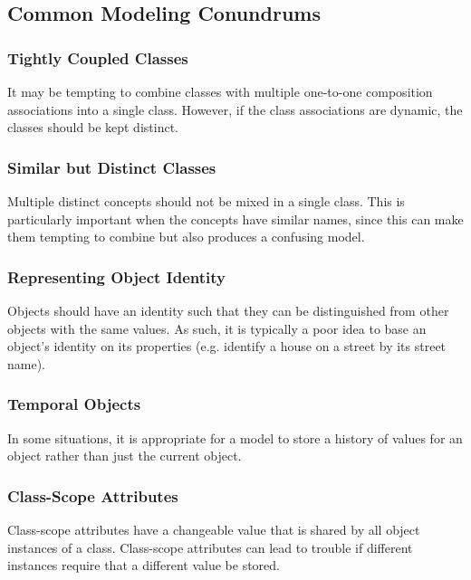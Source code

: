 \documentclass[12pt,titlepage]{article}
\begin{document}
    \subsection{Common Modeling Conundrums}

      \subsubsection{Tightly Coupled Classes}
        It may be tempting to combine classes with multiple one-to-one composition associations into a single class. However, if the class associations are dynamic, the classes should
        be kept distinct.

      \subsubsection{Similar but Distinct Classes}
        Multiple distinct concepts should not be mixed in a single class. This is particularly important when the concepts have similar names, since this can make them tempting to
        combine but also produces a confusing model.

      \subsubsection{Representing Object Identity}
        Objects should have an identity such that they can be distinguished from other objects with the same values. As such, it is typically a poor idea to base an object's identity
        on its properties (e.g. identify a house on a street by its street name).

      \subsubsection{Temporal Objects}
        In some situations, it is appropriate for a model to store a history of values for an object rather than just the current object.

      \subsubsection{Class-Scope Attributes}
        Class-scope attributes have a changeable value that is shared by all object instances of a class. Class-scope attributes can lead to trouble if different instances require
        that a different value be stored.

  \newpage
\end{document}
